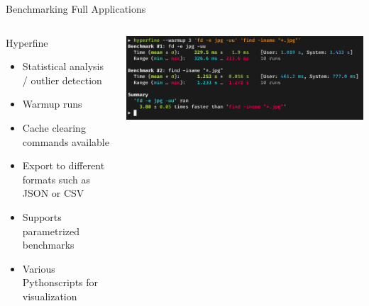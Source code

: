 \documentclass[compress,aspectratio=169]{beamer}
\begin{document}
\begin{frame}{Benchmarking Full Applications}
  \begin{columns}
    \begin{column}{0.5\textwidth}
      \begin{block}{Hyperfine \cite{hyperfine}}
        \begin{itemize}
          \item Statistical analysis / outlier detection
          \item Warmup runs
          \item Cache clearing commands available
          \item Export to different formats such as JSON or CSV
          \item Supports parametrized benchmarks
          \item Various Pythonscripts for visualization
        \end{itemize}
      \end{block}
    \end{column}
    \begin{column}{0.5\textwidth}
      \includegraphics[width=\textwidth]{./assets/hyperfine.png} \cite{hyperfine}
    \end{column}
  \end{columns}
\end{frame}
\end{document}

